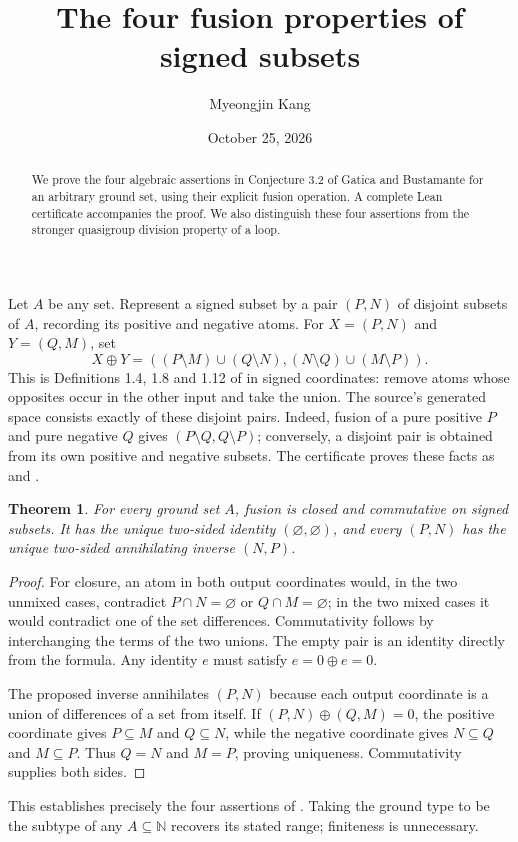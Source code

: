 \documentclass[11pt]{article}
\title{The four fusion properties of signed subsets}
\author{Myeongjin Kang}
\date{October 25, 2026}
\newtheorem{theorem}{Theorem}
\begin{document}
\maketitle
\begin{abstract}
We prove the four algebraic assertions in Conjecture 3.2 of Gatica and
Bustamante for an arbitrary ground set, using their explicit fusion operation.
A complete Lean certificate accompanies the proof. We also distinguish these
four assertions from the stronger quasigroup division property of a loop.
\end{abstract}
Let $A$ be any set. Represent a signed subset by a pair $(P,N)$ of disjoint
subsets of $A$, recording its positive and negative atoms. For $X=(P,N)$ and
$Y=(Q,M)$, set
\[
 X\oplus Y=((P\setminus M)\cup(Q\setminus N),
 (N\setminus Q)\cup(M\setminus P)).
\]
This is Definitions 1.4, 1.8 and 1.12 of \cite{GB} in signed coordinates:
remove atoms whose opposites occur in the other input and take the union.
The source's generated space consists exactly of these disjoint pairs.
Indeed, fusion of a pure positive $P$ and pure negative $Q$ gives
$(P\setminus Q,Q\setminus P)$; conversely, a disjoint pair is obtained from
its own positive and negative subsets. The certificate proves these facts
as  and .
\begin{theorem}
For every ground set $A$, fusion is closed and commutative on signed subsets.
It has the unique two-sided identity $(\varnothing,\varnothing)$, and every
$(P,N)$ has the unique two-sided annihilating inverse $(N,P)$.
\end{theorem}
\begin{proof}
For closure, an atom in both output coordinates would, in the two unmixed
cases, contradict $P\cap N=\varnothing$ or $Q\cap M=\varnothing$; in the two
mixed cases it would contradict one of the set differences. Commutativity
follows by interchanging the terms of the two unions. The empty pair is an
identity directly from the formula. Any identity $e$ must satisfy
$e=0\oplus e=0$.

The proposed inverse annihilates $(P,N)$ because each output coordinate is
a union of differences of a set from itself. If $(P,N)\oplus(Q,M)=0$, the
positive coordinate gives $P\subseteq M$ and $Q\subseteq N$, while the
negative coordinate gives $N\subseteq Q$ and $M\subseteq P$. Thus $Q=N$
and $M=P$, proving uniqueness. Commutativity supplies both sides.
\end{proof}
This establishes precisely the four assertions of \cite[Conjecture 3.2]{GB}.
Taking the ground type to be the subtype of any $A\subseteq\mathbb N$
recovers its stated range; finiteness is unnecessary.
\end{document}
